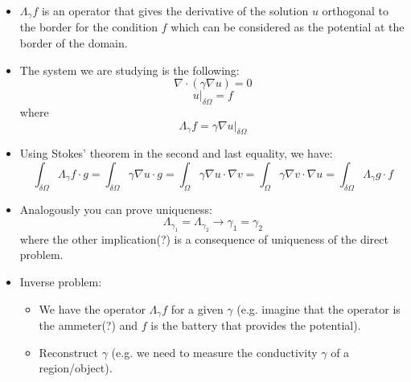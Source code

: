 \documentclass{article}
\begin{document}
\begin{itemize}
    \item $ \Lambda_\gamma f $ is an operator that gives the derivative of the solution $u$ orthogonal to the border for 
    the condition $f$ which can be considered as the potential at the border of the domain.

    \item The system we are studying is the following:
    \begin{equation}\label{original-equation}
        \nabla \cdot (\gamma \nabla u) = 0
    \end{equation}
    \begin{equation}\label{original-border-condition}
        u|_{\delta \Omega} = f
    \end{equation}
    where 
    \begin{equation}
        \Lambda_\gamma f = \gamma \nabla u|_{\delta \Omega}
    \end{equation}

    \item Using Stokes' theorem in the second and last equality, we have:
    \begin{equation}
        \int_{\delta \Omega}  \Lambda_\gamma f \cdot g = \int_{\delta \Omega} \gamma \nabla u \cdot g = 
        \int_{\Omega} \gamma \nabla u \cdot \nabla v = \int_{\Omega} \gamma \nabla v \cdot \nabla u =
        \int_{\delta \Omega}  \Lambda_\gamma g \cdot f 
    \end{equation}

    \item Analogously you can prove uniqueness:
    \begin{equation}
        \Lambda_{\gamma_1} = \Lambda_{\gamma_2} \rightarrow \gamma_1 = \gamma_2
    \end{equation}
    where the other implication(?) is a consequence of uniqueness of the direct problem.

    \item Inverse problem:
    \begin{itemize}
        \item We have the operator $\Lambda_\gamma f$ for a given $\gamma$ (e.g. imagine that the operator is the ammeter(?) and $f$ is the
        battery that provides the potential).
        \item Reconstruct $\gamma$ (e.g. we need to measure the conductivity $\gamma$ of a region/object).
    \end{itemize}


\end{itemize}
\end{document}
